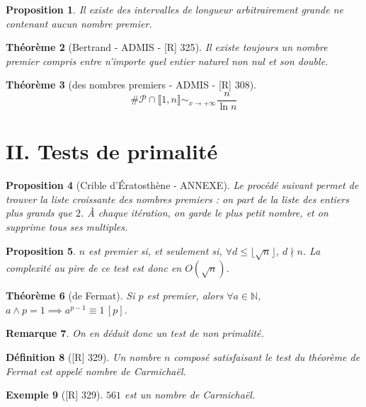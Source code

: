 \documentclass[10pt, a4paper, parskip=full, twoside, twocolumn]{report}
\newtheorem{definition}{Définition}
\newtheorem{theorem}[definition]{Théorème}
\newtheorem{proposition}[definition]{Proposition}
\newtheorem{example}[definition]{Exemple}
\newtheorem{remark}[definition]{Remarque}
\newcommand{\IN}{\mathbb{N}}
\begin{document}
\begin{proposition}
	Il existe des intervalles de longueur arbitrairement grande ne contenant aucun nombre premier.
\end{proposition}

\begin{theorem}[Bertrand - ADMIS - \textnormal{[R] 325}]
	Il existe toujours un nombre premier compris entre n'importe quel entier naturel non nul et son double.
\end{theorem}

\begin{theorem}[des nombres premiers - ADMIS - \textnormal{[R] 308}]
	$$\#\mathcal{P}\cap \llbracket 1,n\rrbracket \sim_{x\to +\infty} \frac{n}{\ln n}$$
\end{theorem}

\section*{II. Tests de primalité}

\begin{proposition}[Crible d'Ératosthène - ANNEXE]
	Le procédé suivant permet de trouver la liste croissante des nombres premiers : on part de la liste des entiers plus grands que $2$. À chaque itération,
	on garde le plus petit nombre, et on supprime tous ses multiples.
\end{proposition}

\begin{proposition}
	$n$ est premier si, et seulement si, $\forall d\leq \lfloor\sqrt{n}\rfloor$, $d\nmid n$.
	La complexité au pire de ce test est donc en $O(\sqrt{n})$.
\end{proposition}

\begin{theorem}[de Fermat]
	Si $p$ est premier, alors $\forall a\in \IN$, $a\wedge p=1\implies a^{p-1} \equiv 1\,[p]$.
\end{theorem}

\begin{remark}
	On en déduit donc un test de non primalité.
\end{remark}

\begin{definition}[\textnormal{[R] 329}]
	Un nombre $n$ composé satisfaisant le test du théorème de Fermat est appelé \emph{nombre de Carmichaël}.
\end{definition}

\begin{example}[\textnormal{[R] 329}]
	$561$ est un nombre de Carmichaël.
\end{example}
\end{document}
